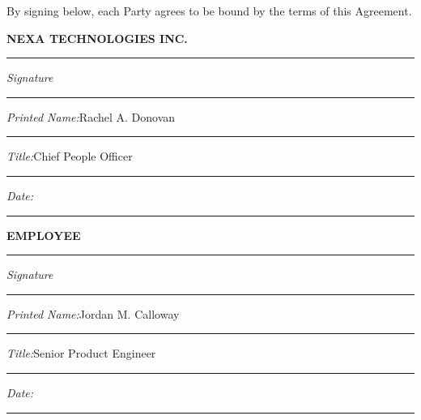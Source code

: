 \documentclass[11pt,a4paper]{article}
\begin{document}
\begin{tcolorbox}[ndabox, title={\faPen\enspace Signatures}]

  \small
  \noindent
  By signing below, each Party agrees to be bound by the terms of this Agreement.

  \vspace{16pt}

  \noindent
  \begin{minipage}[t]{0.45\linewidth}
    \textbf{\color{NavyDeep}NEXA TECHNOLOGIES INC.}\\[24pt]
    \hrule
    \vspace{4pt}
    \textit{Signature}\\[14pt]
    \hrule
    \vspace{4pt}
    \textit{Printed Name:}\enspace Rachel A. Donovan\\[8pt]
    \hrule
    \vspace{4pt}
    \textit{Title:}\enspace Chief People Officer\\[8pt]
    \hrule
    \vspace{4pt}
    \textit{Date:}\enspace \rule{4cm}{0.4pt}
  \end{minipage}%
  \hfill%
  \begin{minipage}[t]{0.45\linewidth}
    \textbf{\color{NavyDeep}EMPLOYEE}\\[24pt]
    \hrule
    \vspace{4pt}
    \textit{Signature}\\[14pt]
    \hrule
    \vspace{4pt}
    \textit{Printed Name:}\enspace Jordan M. Calloway\\[8pt]
    \hrule
    \vspace{4pt}
    \textit{Title:}\enspace Senior Product Engineer\\[8pt]
    \hrule
    \vspace{4pt}
    \textit{Date:}\enspace \rule{4cm}{0.4pt}
  \end{minipage}

  \vspace{16pt}


\end{tcolorbox}
\end{document}
